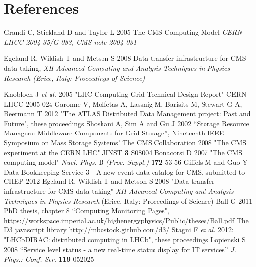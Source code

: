 \section*{References}

\begin{thebibliography}{1}

  Grandi C, Stickland D and Taylor L 2005 The CMS Computing Model {\it CERN-LHCC-2004-35/G-083, CMS note 2004-031}

  Egeland R, Wildish T and Metson S 2008 Data transfer infrastructure for CMS data taking,  {\it XII Advanced Computing and Analysis Techniques in Physics Research (Erice, Italy: Proceedings of Science)}



 Knobloch J {\it et al.} 2005 "LHC Computing Grid Technical Design Report" CERN-LHCC-2005-024
 Garonne V, Molfetas A, Lassnig M, Barisits M, Stewart G A, Beermann T 2012 "The ATLAS Distributed Data Management project: Past and Future", these proceedings
 Shoshani A,  Sim A and  Gu J 2002 ``Storage Resource Managers: Middleware Components for Grid Storage'',  Nineteenth IEEE Symposium on Mass Storage Systems'
 The CMS Collaboration 2008 "The CMS experiment at the CERN LHC" JINST {\bf 3} S08004
 Bonacorsi D 2007 "The CMS computing model" {\it Nucl. Phys.} B {\it (Proc. Suppl.)} {\bf 172} 53-56
 Giffels M and Guo Y Data Bookkeeping Service 3 - A new event data catalog for CMS, submitted to CHEP 2012
 Egeland R, Wildish T and Metson S 2008 "Data transfer infrastructure for CMS data taking" {\it XII Advanced Computing and Analysis Techniques in Physics Research} (Erice, Italy: Proceedings of Science)
 Ball G 2011 PhD thesis, chapter 8 ``Computing Monitoring Pages",
 https://workspace.imperial.ac.uk/highenergyphysics/Public/theses/Ball.pdf
 The D3 javascript library http://mbostock.github.com/d3/
 Stagni F {\it et al.} 2012: "LHCbDIRAC: distributed computing in LHCb",  these proceedings 
 Lopienski S 2008 ``Service level status - a new real-time status display for IT services'' {\it J. Phys.: Conf. Ser.}  {\bf 119} 052025



\end{thebibliography}
